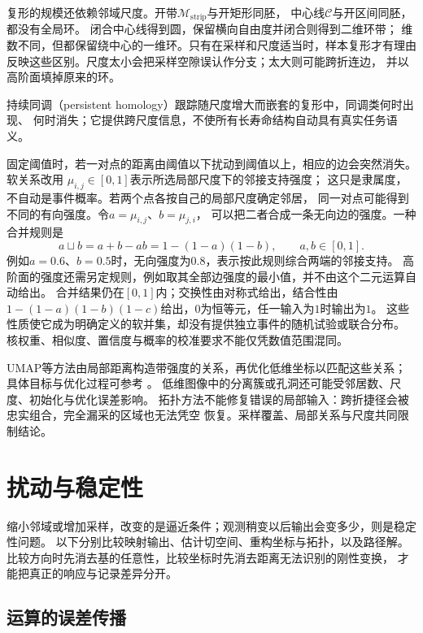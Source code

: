 复形的规模还依赖邻域尺度。开带$\mathcal M_{\mathrm{strip}}$与开矩形同胚，
中心线$\mathcal C$与开区间同胚，都没有全局环。
闭合中心线得到圆，保留横向自由度并闭合则得到二维环带；
维数不同，但都保留绕中心的一维环。只有在采样和尺度适当时，样本复形才有理由
反映这些区别。尺度太小会把采样空隙误认作分支；太大则可能跨折连边，
并以高阶面填掉原来的环。

持续同调（persistent homology）跟踪随尺度增大而嵌套的复形中，同调类何时出现、
何时消失；它提供跨尺度信息，不使所有长寿命结构自动具有真实任务语义。


固定阈值时，若一对点的距离由阈值以下扰动到阈值以上，相应的边会突然消失。软关系改用
$\mu_{i,j}\in[0,1]$表示所选局部尺度下的邻接支持强度；
这只是隶属度，不自动是事件概率。若两个点各按自己的局部尺度确定邻居，
同一对点可能得到不同的有向强度。令$a=\mu_{i,j}$、$b=\mu_{j,i}$，
可以把二者合成一条无向边的强度。一种合并规则是
\begin{equation}
 a\mathbin{\sqcup}b=a+b-ab=1-(1-a)(1-b),\qquad a,b\in[0,1].
 \label{eq:geometry-fuzzy-union}
\end{equation}
例如$a=0.6$、$b=0.5$时，无向强度为$0.8$，表示按此规则综合两端的邻接支持。
高阶面的强度还需另定规则，例如取其全部边强度的最小值，并不由这个二元运算自动给出。
合并结果仍在$[0,1]$内；交换性由对称式给出，结合性由
$1-(1-a)(1-b)(1-c)$给出，$0$为恒等元，任一输入为$1$时输出为$1$。
这些性质使它成为明确定义的软并集，却没有提供独立事件的随机试验或联合分布。
核权重、相似度、置信度与概率的校准要求不能仅凭数值范围混同。

UMAP等方法由局部距离构造带强度的关系，再优化低维坐标以匹配这些关系；
具体目标与优化过程可参考
。
低维图像中的分离簇或孔洞还可能受邻居数、尺度、初始化与优化误差影响。
拓扑方法不能修复错误的局部输入：跨折捷径会被忠实组合，完全漏采的区域也无法凭空
恢复。采样覆盖、局部关系与尺度共同限制结论。

\section{扰动与稳定性}
\label{sec:geometry-stability}

缩小邻域或增加采样，改变的是逼近条件；观测稍变以后输出会变多少，则是稳定性问题。
以下分别比较映射输出、估计切空间、重构坐标与拓扑，以及路径解。
比较方向时先消去基的任意性，比较坐标时先消去距离无法识别的刚性变换，
才能把真正的响应与记录差异分开。

\subsection{运算的误差传播}
\label{sec:geometry-operation-stability}

